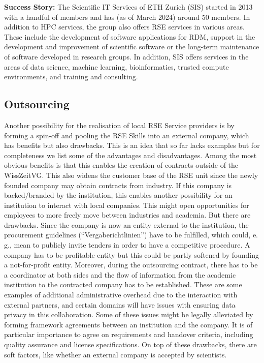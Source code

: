 \documentclass[10pt,letterpaper]{article}
\newcommand*{\eg}{e.\,g.,\xspace}
\begin{document}
\begin{mdframed}
\textbf{Success Story:} The Scientific IT Services of ETH Zurich (SIS) started in 2013 with a handful of members and has (as of March 2024) around 50 members.
In addition to HPC services, the group also offers RSE services in various areas.
These include the development of software applications for RDM, support in the development and improvement of scientific software or the long-term maintenance of software developed in research groups.
In addition, SIS offers services in the areas of data science, machine learning, bioinformatics, trusted compute environments, and training and consulting.
\end{mdframed}

\subsection*{Outsourcing}

Another possibility for the realisation of local RSE Service providers is by forming a spin-off and pooling the RSE Skills into an external company, which has benefits but also drawbacks.
This is an idea that so far lacks examples but for completeness we list some of the advantages and disadvantages.
Among the most obvious benefits is that this enables the creation of contracts outside of the WissZeitVG.\@
This also widens the customer base of the RSE unit since the newly founded company may obtain contracts from industry.
If this company is backed/branded by the institution, this enables another possibility for an institution to interact with local companies.
This might open opportunities for employees to more freely move between industries and academia.
But there are drawbacks.
Since the company is now an entity external to the institution, the procurement guidelines (“Vergaberichtlinien”) have to be fulfilled, which could, \eg{} mean to publicly invite tenders in order to have a competitive procedure.
A company has to be profitable entity but this could be partly softened by founding a not-for-profit entity.
Moreover, during the outsourcing contract, there has to be a coordinator at both sides and the flow of information from the academic institution to the contracted company has to be established.
These are some examples of additional administrative overhead due to the interaction with external partners, and certain domains will have issues with ensuring data privacy in this collaboration.
Some of these issues might be legally alleviated by forming framework agreements between an institution and the company.
It is of particular importance to agree on requirements and handover criteria, including quality assurance and license specifications.
On top of these drawbacks, there are soft factors, like whether an external company is accepted by scientists.
\end{document}
